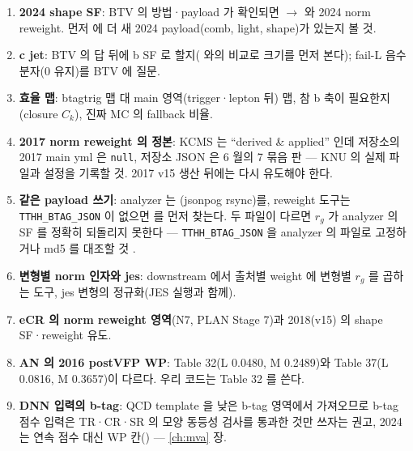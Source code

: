 \begin{openq}
\begin{enumerate}
\item \textbf{2024 shape SF}: BTV 의 방법·payload 가 확인되면  $\to$  와 2024 norm reweight. 먼저
   에 더 새 2024 payload(comb, light, shape)가 있는지 볼 것.
\item \textbf{c jet}: BTV 의 답 뒤에 b SF 로 할지( 와의 비교로 크기를 먼저 본다); fail-L 음수 분자(0 유지)를 BTV 에 질문.
\item \textbf{효율 맵}: btagtrig 맵 대 main 영역(trigger·lepton 뒤) 맵, 참 b 축이 필요한지(closure $C_k$), 진짜 MC 의 fallback 비율.
\item \textbf{2017 norm reweight 의 정본}: KCMS 는 ``derived \& applied'' 인데 저장소의 2017 main yml 은 \texttt{null}, 저장소 JSON 은 6 월의 7 묶음 판 ---
  KNU 의 실제 파일과 설정을 기록할 것. 2017 v15 생산 뒤에는 다시 유도해야 한다.
\item \textbf{같은 payload 쓰기}: analyzer 는 (jsonpog rsync)를, reweight 도구는 \texttt{TTHH\_BTAG\_JSON} 이 없으면
   를 먼저 찾는다.
  두 파일이 다르면 $r_g$ 가 analyzer 의 SF 를 정확히 되돌리지 못한다 --- \texttt{TTHH\_BTAG\_JSON} 을 analyzer 의 파일로 고정하거나 md5 를 대조할 것
  \tagours.
\item \textbf{변형별 norm 인자와 jes}: downstream 에서 출처별 weight 에 변형별 $r_g$ 를 곱하는 도구, jes 변형의 정규화(JES 실행과 함께).
\item \textbf{eCR 의 norm reweight 영역}(N7, PLAN Stage 7)과 2018(v15) 의 shape SF·reweight 유도.
\item \textbf{AN 의 2016 postVFP WP}: Table 32(L 0.0480, M 0.2489)와 Table 37(L 0.0816, M 0.3657)이 다르다.
  우리 코드는 Table 32 를 쓴다.
\item \textbf{DNN 입력의 b-tag}: QCD template 을 낮은 b-tag 영역에서 가져오므로 b-tag 점수 입력은 TR·CR·SR 의 모양 동등성 검사를 통과한 것만 쓰자는
  권고, 2024 는 연속 점수 대신 WP 칸() --- \ref{ch:mva} 장.
\end{enumerate}
\end{openq}
